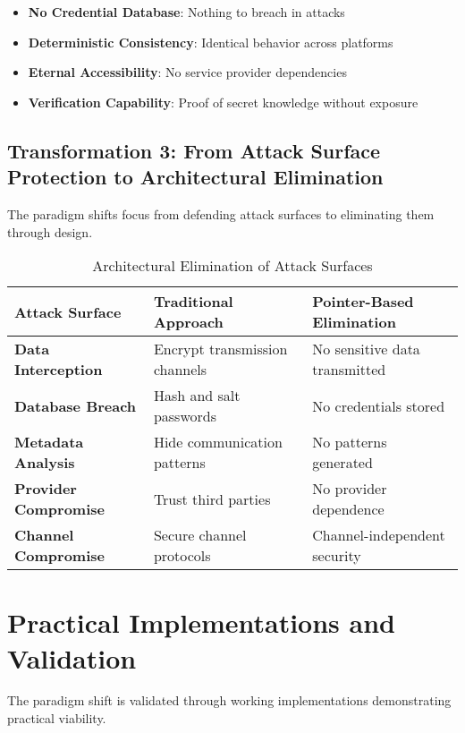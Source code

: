 \documentclass[11pt,a4paper]{article}
\begin{document}
\begin{itemize}
    \item \textbf{No Credential Database}: Nothing to breach in attacks
    \item \textbf{Deterministic Consistency}: Identical behavior across platforms
    \item \textbf{Eternal Accessibility}: No service provider dependencies
    \item \textbf{Verification Capability}: Proof of secret knowledge without exposure
\end{itemize}

\subsection{Transformation 3: From Attack Surface Protection to Architectural Elimination}

The paradigm shifts focus from defending attack surfaces to eliminating them through design.

\begin{table}[h]
\centering
\caption{Architectural Elimination of Attack Surfaces}
\begin{tabularx}{\textwidth}{|l|X|X|}
\hline
\textbf{Attack Surface} & \textbf{Traditional Approach} & \textbf{Pointer-Based Elimination} \\
\hline
\textbf{Data Interception} & Encrypt transmission channels & No sensitive data transmitted \\
\hline
\textbf{Database Breach} & Hash and salt passwords & No credentials stored \\
\hline
\textbf{Metadata Analysis} & Hide communication patterns & No patterns generated \\
\hline
\textbf{Provider Compromise} & Trust third parties & No provider dependence \\
\hline
\textbf{Channel Compromise} & Secure channel protocols & Channel-independent security \\
\hline
\end{tabularx}
\end{table}

\section{Practical Implementations and Validation}

The paradigm shift is validated through working implementations demonstrating practical viability.
\end{document}
